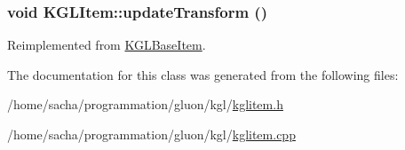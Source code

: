 \hypertarget{class_k_g_l_item_3dbecc9db8e526a4c9623b35a004ed3c}{
\subsubsection[{updateTransform}]{\setlength{\rightskip}{0pt plus 5cm}void KGLItem::updateTransform ()}}
\label{class_k_g_l_item_3dbecc9db8e526a4c9623b35a004ed3c}




Reimplemented from \hyperlink{class_k_g_l_base_item_6e020830d4452864cdb6c8fea4531e0d}{KGLBaseItem}.

The documentation for this class was generated from the following files:\begin{CompactItemize}
\item 
/home/sacha/programmation/gluon/kgl/\hyperlink{kglitem_8h}{kglitem.h}\item 
/home/sacha/programmation/gluon/kgl/\hyperlink{kglitem_8cpp}{kglitem.cpp}\end{CompactItemize}

